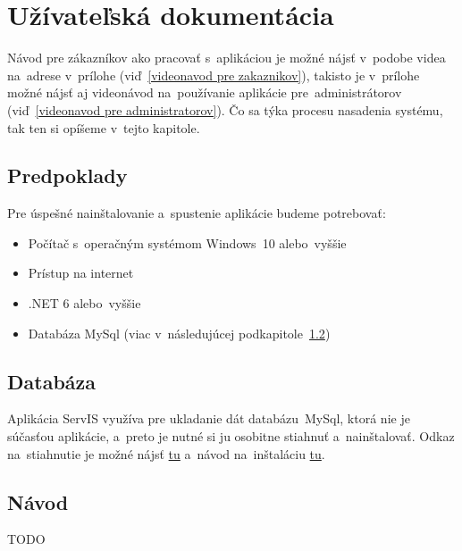 \chapter{Užívateľská dokumentácia}

Návod pre zákazníkov ako pracovať s~aplikáciou je možné nájsť v~podobe videa na~adrese v~prílohe (viď~\ref{videonavod pre zakaznikov}), takisto je v~prílohe možné nájsť aj videonávod na~používanie aplikácie pre~administrátorov (viď~\ref{videonavod pre administratorov}). Čo sa týka procesu nasadenia systému, tak ten si opíšeme v~tejto kapitole.

\section{Predpoklady}

Pre úspešné nainštalovanie a~spustenie aplikácie budeme potrebovať:

\begin{itemize}
\item Počítač s~operačným systémom Windows~10 alebo~vyššie
\item Prístup na internet
\item .NET 6 alebo~vyššie
\item Databáza MySql (viac v~následujúcej podkapitole~\ref{databaza})
\end{itemize}

\section{Databáza}
\label{databaza}

Aplikácia ServIS využíva pre ukladanie dát databázu~MySql, ktorá nie je súčasťou aplikácie, a~preto je nutné si ju osobitne stiahnuť a~nainštalovať. Odkaz na~stiahnutie je možné nájsť \href{https://dev.mysql.com/downloads/mysql/}{tu} a~návod na~inštaláciu \href{https://dev.mysql.com/doc/refman/8.0/en/installing.html}{tu}.

\section{Návod}

TODO
